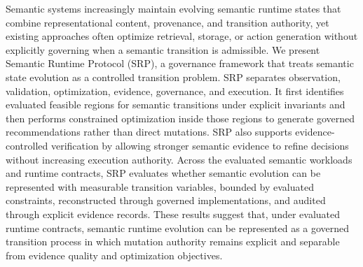 \markdownRendererDocumentBegin
{}\markdownRendererSectionBegin
{}\markdownRendererInterblockSeparator
{}\markdownRendererSectionBegin
{}\markdownRendererInterblockSeparator
{}Semantic systems increasingly maintain evolving semantic runtime states that combine representational content, provenance, and transition authority, yet existing approaches often optimize retrieval, storage, or action generation without explicitly governing when a semantic transition is admissible. We present Semantic Runtime Protocol (SRP), a governance framework that treats semantic state evolution as a controlled transition problem. SRP separates observation, validation, optimization, evidence, governance, and execution. It first identifies evaluated feasible regions for semantic transitions under explicit invariants and then performs constrained optimization inside those regions to generate governed recommendations rather than direct mutations. SRP also supports evidence-controlled verification by allowing stronger semantic evidence to refine decisions without increasing execution authority. Across the evaluated semantic workloads and runtime contracts, SRP evaluates whether semantic evolution can be represented with measurable transition variables, bounded by evaluated constraints, reconstructed through governed implementations, and audited through explicit evidence records. These results suggest that, under evaluated runtime contracts, semantic runtime evolution can be represented as a governed transition process in which mutation authority remains explicit and separable from evidence quality and optimization objectives.\markdownRendererInterblockSeparator
{}
\markdownRendererSectionEnd \markdownRendererSectionBegin
{}\markdownRendererInterblockSeparator
